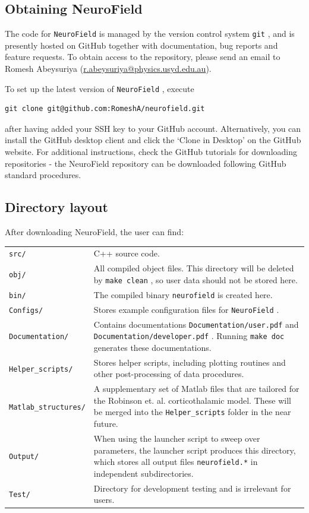 \documentclass[12pt,a4paper]{article}
\newcommand{\type}[1]{ {\small\small\tt #1} }
\newcommand{\NF}[0]{ \type{NeuroField}}
\begin{document}
\subsection{Obtaining NeuroField}

The code for \NF is managed by the version control system \type{git}, and is presently hosted on GitHub together with documentation, bug reports and feature requests. To obtain access to the repository, please send an email to Romesh Abeysuriya (\url{r.abeysuriya@physics.usyd.edu.au}).

To set up the latest version of \NF, execute
\begin{lstlisting}
git clone git@github.com:RomeshA/neurofield.git
\end{lstlisting}
after having added your SSH key to your GitHub account. Alternatively, you can install the GitHub desktop client and click the `Clone in Desktop' on the GitHub website. For additional instructions, check the GitHub tutorials for downloading repositories - the NeuroField repository can be downloaded following GitHub standard procedures. 

\subsection{Directory layout}

After downloading NeuroField, the user can find:

\begin{tabular}{l p{14.4cm}}
\type{src/}& C++ source code.\\
\type{obj/}& All compiled object files. This directory will be deleted by \type{make clean}, so user data should not be stored here.\\
\type{bin/}& The compiled binary \type{neurofield} is created here.\\
\type{Configs/}& Stores example configuration files for \NF.\\
\type{Documentation/}& Contains documentations \type{Documentation/user.pdf} and \type{Documentation/developer.pdf}. Running \type{make doc} generates these documentations.\\
\type{Helper\_scripts/}& Stores helper scripts, including plotting routines and other post-processing of data procedures.\\
\type{Matlab\_structures/}& A supplementary set of Matlab files that are tailored for the Robinson et. al. corticothalamic model. These will be merged into the \type{Helper\_scripts} folder in the near future.\\
\type{Output/}& When using the launcher script to sweep over parameters, the launcher script produces this directory, which stores all output files \type{neurofield.*} in independent subdirectories.\\
\type{Test/}& Directory for development testing and is irrelevant for users.\\
\end{tabular}
\end{document}
